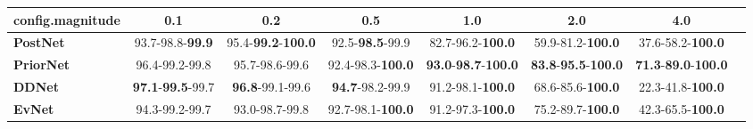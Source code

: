 \begin{tabular}{lccccccc}
\toprule
\textbf{config.magnitude} &                               0.1 &                                0.2 &                       0.5 &                                         1.0 &                                         2.0 &                                         4.0 \\
\midrule
\textbf{PostNet } &           93.7-98.8-\textbf{99.9} &  95.4-\textbf{99.2}-\textbf{100.0} &   92.5-\textbf{98.5}-99.9 &                    82.7-96.2-\textbf{100.0} &                    59.9-81.2-\textbf{100.0} &                    37.6-58.2-\textbf{100.0} \\
\textbf{PriorNet} &                    96.4-99.2-99.8 &                     95.7-98.6-99.6 &  92.4-98.3-\textbf{100.0} &  \textbf{93.0}-\textbf{98.7}-\textbf{100.0} &  \textbf{83.8}-\textbf{95.5}-\textbf{100.0} &  \textbf{71.3}-\textbf{89.0}-\textbf{100.0} \\
\textbf{DDNet   } &  \textbf{97.1}-\textbf{99.5}-99.7 &            \textbf{96.8}-99.1-99.6 &   \textbf{94.7}-98.2-99.9 &                    91.2-98.1-\textbf{100.0} &                    68.6-85.6-\textbf{100.0} &                    22.3-41.8-\textbf{100.0} \\
\textbf{EvNet   } &                    94.3-99.2-99.7 &                     93.0-98.7-99.8 &  92.7-98.1-\textbf{100.0} &                    91.2-97.3-\textbf{100.0} &                    75.2-89.7-\textbf{100.0} &                    42.3-65.5-\textbf{100.0} \\
\bottomrule
\end{tabular}
